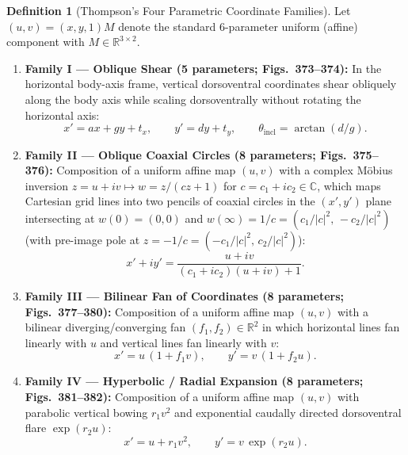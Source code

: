 \documentclass[11pt,a4paper]{article}
\theoremstyle{definition}
\newtheorem{definition}[theorem]{Definition}
\theoremstyle{remark}
\newcommand{\R}{\mathbb{R}}
\newcommand{\C}{\mathbb{C}}
\begin{document}
\begin{definition}[Thompson's Four Parametric Coordinate Families]
Let $(u, v) = (x, y, 1) M$ denote the standard 6-parameter uniform (affine) component with $M \in \R^{3 \times 2}$.
\begin{enumerate}
  \item \textbf{Family I --- Oblique Shear (5 parameters; Figs.\ 373--374):} In the horizontal body-axis frame, vertical dorsoventral coordinates shear obliquely along the body axis while scaling dorsoventrally without rotating the horizontal axis:
  \begin{equation}
    x' = a x + g y + t_x, \qquad y' = d y + t_y, \qquad \theta_{\mathrm{incl}} = \arctan(d / g).
  \end{equation}
  \item \textbf{Family II --- Oblique Coaxial Circles (8 parameters; Figs.\ 375--376):} Composition of a uniform affine map $(u, v)$ with a complex M\"obius inversion $z = u + i v \mapsto w = z / (c z + 1)$ for $c = c_1 + i c_2 \in \C$, which maps Cartesian grid lines into two pencils of coaxial circles in the $(x', y')$ plane intersecting at $w(0) = (0, 0)$ and $w(\infty) = 1/c = (c_1/|c|^2,\, -c_2/|c|^2)$ (with pre-image pole at $z = -1/c = (-c_1/|c|^2,\, c_2/|c|^2)$):
  \begin{equation}
    x' + i y' = \frac{u + i v}{(c_1 + i c_2)(u + i v) + 1}.
  \end{equation}
  \item \textbf{Family III --- Bilinear Fan of Coordinates (8 parameters; Figs.\ 377--380):} Composition of a uniform affine map $(u, v)$ with a bilinear diverging/converging fan $(f_1, f_2) \in \R^2$ in which horizontal lines fan linearly with $u$ and vertical lines fan linearly with $v$:
  \begin{equation}
    x' = u\,(1 + f_1 v), \qquad y' = v\,(1 + f_2 u).
  \end{equation}
  \item \textbf{Family IV --- Hyperbolic / Radial Expansion (8 parameters; Figs.\ 381--382):} Composition of a uniform affine map $(u, v)$ with parabolic vertical bowing $r_1 v^2$ and exponential caudally directed dorsoventral flare $\exp(r_2 u)$:
  \begin{equation}
    x' = u + r_1 v^2, \qquad y' = v\,\exp(r_2 u).
  \end{equation}
\end{enumerate}
\end{definition}
\end{document}

